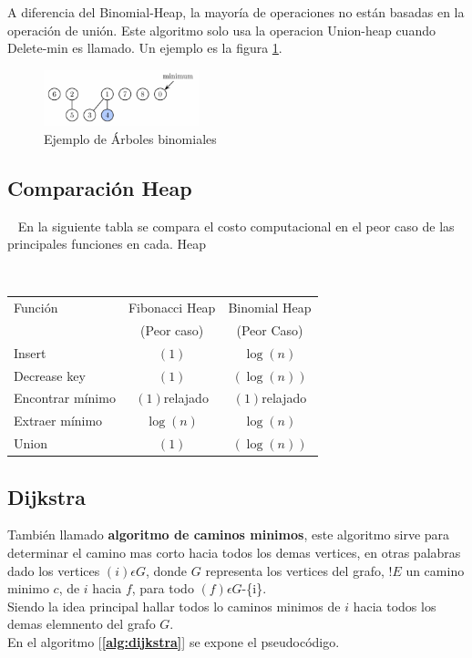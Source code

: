 \documentclass[a4paper,twocolumn,10pt]{article}
\begin{document}
A diferencia del Binomial-Heap, la mayoría de operaciones no están basadas en la operación de unión. Este algoritmo 
solo usa la operacion Union-heap cuando Delete-min es llamado.
\newline
Un ejemplo es la figura \ref{Figure:fibonacci_heap}.

\begin{figure}
 \caption{Ejemplo de Árboles binomiales}\label{Figure:fibonacci_heap}
 \centering
    \includegraphics[width=0.4\textwidth]{fibonacci_heap.png}
\end{figure}


\subsection{Comparación Heap}
~\newline
En la siguiente tabla se compara el costo computacional en el peor caso de las principales funciones en cada. 
Heap \cite{libro_cormen}

\vspace{5mm}
~\newline
\begin{tabular}{ l | c | c }
 \hline                        
  Función & Fibonacci Heap& Binomial Heap\\
	  & (Peor caso) & (Peor Caso) \\
  \hline
  Insert & $(1)$ & $\log(n)$ \\
  Decrease key & $(1)$ & $(\log(n))$ \\
  Encontrar mínimo & $(1)$relajado & $(1)$relajado \\
  Extraer mínimo & $\log(n)$ & $\log(n)$ \\
  Union & $(1)$ & $(\log(n))$ \\
  \hline
\end{tabular} 


\subsection{Dijkstra}
También llamado \textbf{algoritmo de caminos minimos}, este algoritmo sirve para determinar el camino mas corto 
hacia todos los demas vertices, en otras palabras dado los vertices $(i) \epsilon  G$, donde $G$ representa 
los vertices del grafo, $!E$ un camino minimo $c$, de $i$ hacia $f$, para todo $(f)\epsilon G$-\{i\}.\\
Siendo la idea principal hallar todos lo caminos minimos de $i$ hacia todos los demas elemnento del grafo $G$.\\
En el algoritmo [\textbf{\ref{alg:dijkstra}}] se expone el pseudocódigo.
\end{document}
